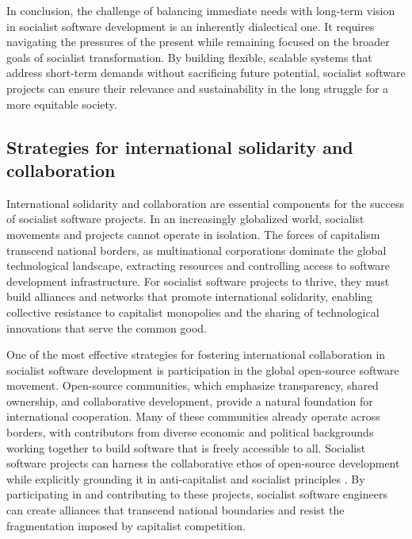 \begin{refsection}
In conclusion, the challenge of balancing immediate needs with long-term vision in socialist software development is an inherently dialectical one. It requires navigating the pressures of the present while remaining focused on the broader goals of socialist transformation. By building flexible, scalable systems that address short-term demands without sacrificing future potential, socialist software projects can ensure their relevance and sustainability in the long struggle for a more equitable society.

\subsection{Strategies for international solidarity and collaboration}

International solidarity and collaboration are essential components for the success of socialist software projects. In an increasingly globalized world, socialist movements and projects cannot operate in isolation. The forces of capitalism transcend national borders, as multinational corporations dominate the global technological landscape, extracting resources and controlling access to software development infrastructure. For socialist software projects to thrive, they must build alliances and networks that promote international solidarity, enabling collective resistance to capitalist monopolies and the sharing of technological innovations that serve the common good.

One of the most effective strategies for fostering international collaboration in socialist software development is participation in the global open-source software movement. Open-source communities, which emphasize transparency, shared ownership, and collaborative development, provide a natural foundation for international cooperation. Many of these communities already operate across borders, with contributors from diverse economic and political backgrounds working together to build software that is freely accessible to all. Socialist software projects can harness the collaborative ethos of open-source development while explicitly grounding it in anti-capitalist and socialist principles \cite[pp.~78-82]{stallman2002}. By participating in and contributing to these projects, socialist software engineers can create alliances that transcend national boundaries and resist the fragmentation imposed by capitalist competition.


\end{refsection}
